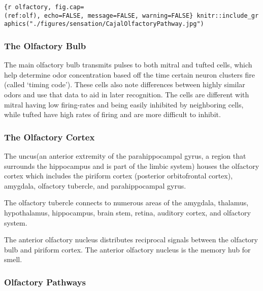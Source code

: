 \texttt{\{r\ olfactory,\ fig.cap=\textquotesingle{}(ref:olf)\textquotesingle{},\ echo=FALSE,\ message=FALSE,\ warning=FALSE\}\ knitr::include\_graphics("./figures/sensation/CajalOlfactoryPathway.jpg")}

\hypertarget{the-olfactory-bulb}{%
\subsubsection{The Olfactory Bulb}\label{the-olfactory-bulb}}

The main olfactory bulb transmits pulses to both mitral and tufted
cells, which help determine odor concentration based off the time
certain neuron clusters fire (called `timing code'). These cells also
note differences between highly similar odors and use that data to aid
in later recognition. The cells are different with mitral having low
firing-rates and being easily inhibited by neighboring cells, while
tufted have high rates of firing and are more difficult to inhibit.

\hypertarget{the-olfactory-cortex}{%
\subsubsection{The Olfactory Cortex}\label{the-olfactory-cortex}}

The uncus(an anterior extremity of the parahippocampal gyrus, a region
that surrounds the hippocampus and is part of the limbic system) houses
the olfactory cortex which includes the piriform cortex (posterior
orbitofrontal cortex), amygdala, olfactory tubercle, and parahippocampal
gyrus.

The olfactory tubercle connects to numerous areas of the amygdala,
thalamus, hypothalamus, hippocampus, brain stem, retina, auditory
cortex, and olfactory system.

The anterior olfactory nucleus distributes reciprocal signals between
the olfactory bulb and piriform cortex. The anterior olfactory nucleus
is the memory hub for smell.

\hypertarget{olfactory-pathways}{%
\subsubsection{Olfactory Pathways}\label{olfactory-pathways}}

